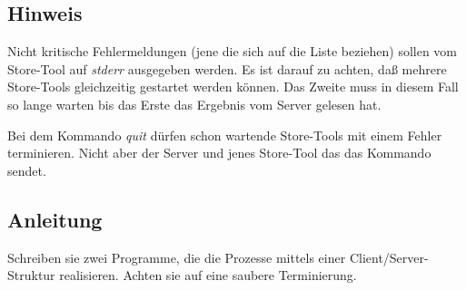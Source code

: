 \subsection*{Hinweis}
Nicht kritische Fehlermeldungen (jene die sich auf die Liste beziehen) sollen vom Store-Tool auf \emph{stderr} ausgegeben werden. Es ist darauf zu achten, daß mehrere Store-Tools gleichzeitig gestartet werden können. Das Zweite muss in diesem Fall so lange warten bis das Erste das Ergebnis vom Server gelesen hat.

Bei dem Kommando \emph{quit} dürfen schon wartende Store-Tools mit einem Fehler terminieren. Nicht aber der Server und jenes Store-Tool das das Kommando sendet.

\subsection*{Anleitung}
Schreiben sie zwei Programme, die die Prozesse mittels einer Client/Server-Struktur realisieren. Achten sie auf eine saubere Terminierung.

\osueguidelinesthree


